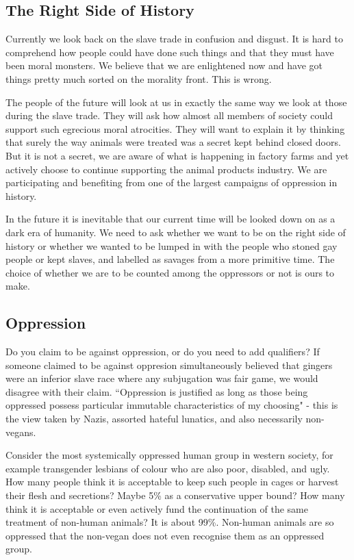 \subsection{The Right Side of History}

Currently we look back on the slave trade in confusion and disgust. It is hard to comprehend how people could have done such things and that they must have been moral monsters. We believe that we are enlightened now and have got things pretty much sorted on the morality front. This is wrong.

The people of the future will look at us in exactly the same way we look at those during the slave trade. They will ask how almost all members of society could support such egrecious moral atrocities. They will want to explain it by thinking that surely the way animals were treated was a secret kept behind closed doors. But it is not a secret, we are aware of what is happening in factory farms and yet actively choose to continue supporting the animal products industry. We are participating and benefiting from one of the largest campaigns of oppression in history.

In the future it is inevitable that our current time will be looked down on as a dark era of humanity. We need to ask whether we want to be on the right side of history or whether we wanted to be lumped in with the people who stoned gay people or kept slaves, and labelled as savages from a more primitive time. The choice of whether we are to be counted among the oppressors or not is ours to make.

\subsection{Oppression}

Do you claim to be against oppression, or do you need to add qualifiers? If someone claimed to be against oppresion simultaneously believed that gingers were an inferior slave race where any subjugation was fair game, we would disagree with their claim. ``Oppression is justified as long as those being oppressed possess particular immutable characteristics of my choosing" - this is the view taken by Nazis, assorted hateful lunatics, and also necessarily non-vegans.

Consider the most systemically oppressed human group in western society, for example transgender lesbians of colour who are also poor, disabled, and ugly. How many people think it is acceptable to keep such people in cages or harvest their flesh and secretions? Maybe 5\% as a conservative upper bound? How many think it is acceptable or even actively fund the continuation of the same treatment of non-human animals? It is about 99\%. Non-human animals are so oppressed that the non-vegan does not even recognise them as an oppressed group.

